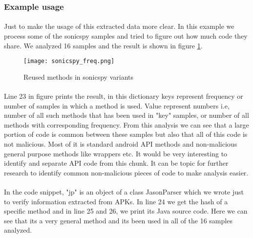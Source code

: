 \documentclass[../main.tex]{subfile}
\begin{document}
		\subsubsection{Example usage}
		\paragraph{}Just to make the usage of this extracted data more clear. In this example we process some of the sonicspy samples and tried to figure out how much code they share. We analyzed 16 samples and the result is shown in figure \ref{fig:sonicspy_freq}.
		
		\begin{figure}
			\texttt{[image: sonicspy\_freq.png]}
			\caption{Reused methods in sonicspy variants}
			\label{fig:sonicspy_freq}
		\end{figure}
		\paragraph{} Line 23 in figure prints the result, in this dictionary keys represent frequency or number of samples in which a method is used. Value represent numbers i.e, number of all such methods that has been used in "key" samples, or number of all methods with corresponding frequency. From this analysis we can see that a large portion of code is common between these samples but also that all of this code is not malicious. Most of it is standard android API methods and non-malicious general purpose methods like wrappers etc. It would be very interesting to identify and separate API code from this chunk. It can be topic for further research to identify common non-malicious pieces of code to make analysis easier. 

		\paragraph{} In the code snippet, "jp" is an object of a class JasonParser which we wrote just to verify information extracted from APKs. In line 24 we get the hash of a specific method and in line 25 and 26, we print its Java source code. Here we can see that its a very general method and its been used in all of the 16 samples analyzed.
		
\end{document}
